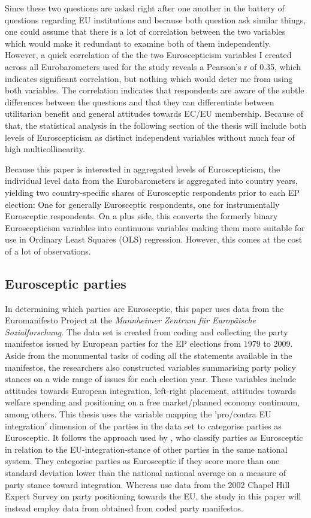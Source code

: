 Since these two questions are asked right after one another in the battery of questions regarding EU institutions and because both question ask similar things,  one could assume that there is a lot of correlation between the two variables which would make it redundant to examine both of them independently. However, a quick correlation of the the two Euroscepticism variables I created across all Eurobarometers used for the study reveals a Pearson's r of 0.35, which indicates significant correlation, but nothing which would deter me from using both variables. The correlation indicates that respondents are aware of the subtle differences between the questions and that they can differentiate between utilitarian benefit and general attitudes towards EC/EU membership. Because of that, the statistical analysis in the following section of the thesis will include both levels of Euroscepticism as distinct independent variables without much fear of high multicollinearity. 

Because this paper is interested in aggregated levels of Euroscepticism, the individual level data from the Eurobarometers is aggregated into country years, yielding two country-specific shares of Eurosceptic respondents prior to each EP election: One for generally Eurosceptic respondents, one for instrumentally Eurosceptic respondents. On a plus side, this converts the formerly binary Euroscepticism variables into continuous variables making them more suitable for use in Ordinary Least Squares (OLS) regression. However, this comes at the cost of a lot of observations. 

\subsection{Eurosceptic parties}
In determining which parties are Eurosceptic, this paper uses data from the Euromanifesto Project at the \textit{Mannheimer Zentrum für Europ\"{a}ische Sozialforschung}. The data set is created from coding and collecting the party manifestos issued by European parties for the EP elections from 1979 to 2009. Aside from the monumental tasks of coding all the statements available in the manifestos, the researchers also constructed variables summarising party policy stances on a wide range of issues for each election year. These variables include attitudes towards European integration, left-right placement, attitudes towards welfare spending and positioning on a free market/planned economy continuum, among others. This thesis uses the variable mapping the 'pro/contra EU integration' dimension of the parties in the data set to categorise parties as Eurosceptic.
It follows the approach used by , who classify parties as Eurosceptic in relation to the EU-integration-stance of other parties in the same national system. They categorise parties as Eurosceptic if they score more than one standard deviation lower than the national national average on a measure of party stance toward integration. Whereas  use data from the 2002 Chapel Hill Expert Survey on party positioning towards the EU, the study in this paper will instead employ data from obtained from coded party manifestos. 

